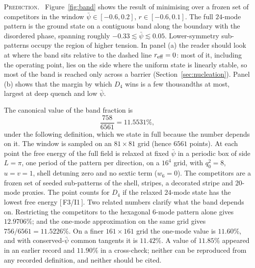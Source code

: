 \documentclass[a4paper,11pt]{article}
\makeatletter
\numberwithin{equation}{section}
\theoremstyle{jsplain}
\theoremstyle{jsrem}
\newcommand{\lbl}[1]{\textcolor{lbl@#1}{\textsc{#1}}.\ }
\newcommand{\grade}[1]{[\,#1\,]}
\makeatother
\begin{document}
\lbl{Prediction} Figure~\ref{fig:band} shows the result of minimising over a frozen set of competitors in the window $\bar\psi\in[-0.6,0.2]$, $r\in[-0.6,0.1]$. The full $24$-mode pattern is the ground state on a contiguous band along the boundary with the disordered phase, spanning roughly $-0.33\lesssim\bar\psi\lesssim0.05$. Lower-symmetry sub-patterns occupy the region of higher tension. In panel (a) the reader should look at where the band sits relative to the dashed line $r_{\rm eff}=0$: most of it, including the operating point, lies on the side where the uniform state is linearly stable, so most of the band is reached only across a barrier (Section~\ref{sec:nucleation}). Panel (b) shows that the margin by which $D_4$ wins is a few thousandths at most, largest at deep quench and low $\bar\psi$.

The canonical value of the band fraction is
\begin{equation}\label{eq:band}
\frac{758}{6561}=11.5531\%,
\end{equation}
under the following definition, which we state in full because the number depends on it. The window is sampled on an $81\times81$ grid (hence $6561$ points). At each point the free energy of the full field is relaxed at fixed $\bar\psi$ in a periodic box of side $L=\pi$, one period of the pattern per direction, on a $16^4$ grid, with $q_0^2=8$, $u=v=1$, shell detuning zero and no sextic term ($w_6=0$). The competitors are a frozen set of seeded sub-patterns of the shell, stripes, a decorated stripe and 20-mode proxies. The point counts for $D_4$ if the relaxed $24$-mode state has the lowest free energy \grade{F3/I1}. Two related numbers clarify what the band depends on. Restricting the competitors to the hexagonal 6-mode pattern alone gives $12.9706\%$; and the one-mode approximation on the same grid gives $756/6561=11.5226\%$. On a finer $161\times161$ grid the one-mode value is $11.60\%$, and with conserved-$\bar\psi$ common tangents it is $11.42\%$. A value of $11.85\%$ appeared in an earlier record and $11.90\%$ in a cross-check; neither can be reproduced from any recorded definition, and neither should be cited.
\end{document}
